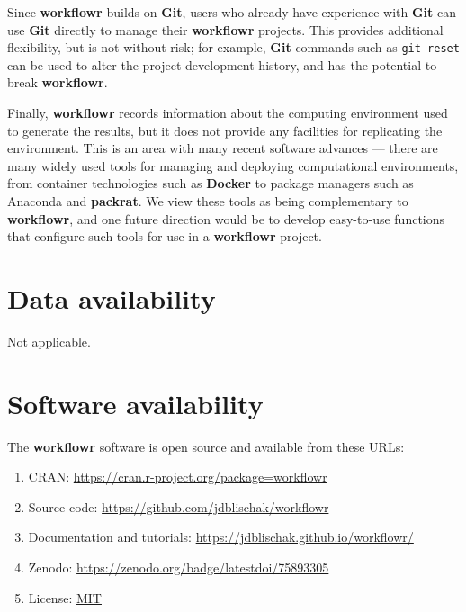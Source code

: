 \documentclass[9pt,a4paper]{extarticle}
\begin{document}
Since \textbf{workflowr} builds on \textbf{Git}, users who already have experience with
 \textbf{Git} can use \textbf{Git} directly to manage their \textbf{workflowr} projects. This
provides additional flexibility, but is not without risk; for example,
 \textbf{Git} commands such as \texttt{git reset} can be used to alter the project
development history, and has the potential to break \textbf{workflowr}.

Finally, \textbf{workflowr} records information about the computing environment
used to generate the results, but it does not provide any facilities for
replicating the environment. This is an area with many recent software
advances --- there are many widely used tools for managing and deploying
computational environments, from container technologies such as \textbf{Docker}
to package managers such as Anaconda and \textbf{packrat}. We view these tools as
being complementary to \textbf{workflowr}, and one future direction would be to
develop easy-to-use functions that configure such tools for use in a
 \textbf{workflowr} project.


\section*{Data availability}

Not applicable.


\section*{Software availability}

The \textbf{workflowr} software is open source and available from these URLs:

\begin{enumerate}

\item CRAN: \url{https://cran.r-project.org/package=workflowr}

\item Source code: \url{https://github.com/jdblischak/workflowr}

\item Documentation and tutorials:
\url{https://jdblischak.github.io/workflowr/}

\item Zenodo: \url{https://zenodo.org/badge/latestdoi/75893305}

\item License: \href{https://choosealicense.com/licenses/mit}{MIT}

\end{enumerate}
\end{document}
